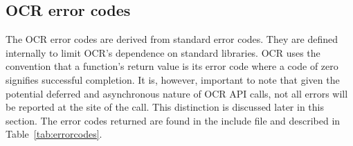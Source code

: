 \subsection{OCR error codes}
\label{sec:errorCodes}
The OCR error codes are derived from standard error codes. They are defined
internally to limit OCR's dependence on standard libraries. OCR uses the convention that a function's
return value is its error code where a code of zero signifies successful completion. It is, however,
important to note that given the potential deferred and asynchronous nature of OCR API calls, not all errors
will be reported at the site of the call. This distinction is discussed later in this section.
The error codes returned are found
in the  include file and described in
Table~\ref{tab:errorcodes}.
\tablelasttail{\hline}
